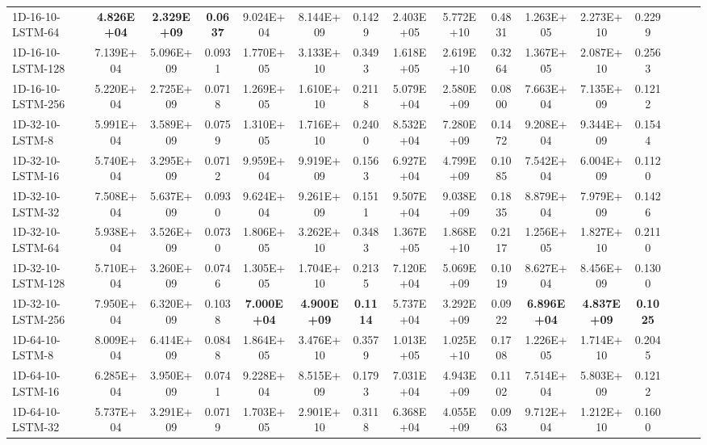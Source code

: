 \begin{landscape}
\begin{longtable}{|l|c|c|c|c|c|c|c|c|c|c|c|c|c|c|c|}
    1D-16-10-LSTM-64 & \cellcolor[rgb]{ .573,  .816,  .314}\textbf{4.826E+04} & \cellcolor[rgb]{ .573,  .816,  .314}\textbf{2.329E+09} & \cellcolor[rgb]{ .573,  .816,  .314}\textbf{0.0637} & 9.024E+04 & 8.144E+09 & 0.1429 & 2.403E+05 & 5.772E+10 & 0.4831 & 1.263E+05 & 2.273E+10 & 0.2299 \\
    1D-16-10-LSTM-128 & 7.139E+04 & 5.096E+09 & 0.0931 & 1.770E+05 & 3.133E+10 & 0.3493 & 1.618E+05 & 2.619E+10 & 0.3264 & 1.367E+05 & 2.087E+10 & 0.2563 \\
    1D-16-10-LSTM-256 & 5.220E+04 & 2.725E+09 & 0.0718 & 1.269E+05 & 1.610E+10 & 0.2118 & 5.079E+04 & 2.580E+09 & 0.0800 & 7.663E+04 & 7.135E+09 & 0.1212 \\
    1D-32-10-LSTM-8 & 5.991E+04 & 3.589E+09 & 0.0759 & 1.310E+05 & 1.716E+10 & 0.2400 & 8.532E+04 & 7.280E+09 & 0.1472 & 9.208E+04 & 9.344E+09 & 0.1544 \\
    1D-32-10-LSTM-16 & 5.740E+04 & 3.295E+09 & 0.0712 & 9.959E+04 & 9.919E+09 & 0.1563 & 6.927E+04 & 4.799E+09 & 0.1085 & 7.542E+04 & 6.004E+09 & 0.1120 \\
    1D-32-10-LSTM-32 & 7.508E+04 & 5.637E+09 & 0.0930 & 9.624E+04 & 9.261E+09 & 0.1511 & 9.507E+04 & 9.038E+09 & 0.1835 & 8.879E+04 & 7.979E+09 & 0.1426 \\
    1D-32-10-LSTM-64 & 5.938E+04 & 3.526E+09 & 0.0730 & 1.806E+05 & 3.262E+10 & 0.3483 & 1.367E+05 & 1.868E+10 & 0.2117 & 1.256E+05 & 1.827E+10 & 0.2110 \\
    1D-32-10-LSTM-128 & 5.710E+04 & 3.260E+09 & 0.0746 & 1.305E+05 & 1.704E+10 & 0.2135 & 7.120E+04 & 5.069E+09 & 0.1019 & 8.627E+04 & 8.456E+09 & 0.1300 \\
    1D-32-10-LSTM-256 & 7.950E+04 & 6.320E+09 & 0.1038 & \cellcolor[rgb]{ .573,  .816,  .314}\textbf{7.000E+04} & \cellcolor[rgb]{ .573,  .816,  .314}\textbf{4.900E+09} & \cellcolor[rgb]{ .573,  .816,  .314}\textbf{0.1114} & 5.737E+04 & 3.292E+09 & 0.0922 & \cellcolor[rgb]{ .573,  .816,  .314}\textbf{6.896E+04} & \cellcolor[rgb]{ .573,  .816,  .314}\textbf{4.837E+09} & \cellcolor[rgb]{ .573,  .816,  .314}\textbf{0.1025} \\
    1D-64-10-LSTM-8 & 8.009E+04 & 6.414E+09 & 0.0848 & 1.864E+05 & 3.476E+10 & 0.3579 & 1.013E+05 & 1.025E+10 & 0.1708 & 1.226E+05 & 1.714E+10 & 0.2045 \\
    1D-64-10-LSTM-16 & 6.285E+04 & 3.950E+09 & 0.0741 & 9.228E+04 & 8.515E+09 & 0.1793 & 7.031E+04 & 4.943E+09 & 0.1102 & 7.514E+04 & 5.803E+09 & 0.1212 \\
    1D-64-10-LSTM-32 & 5.737E+04 & 3.291E+09 & 0.0719 & 1.703E+05 & 2.901E+10 & 0.3118 & 6.368E+04 & 4.055E+09 & 0.0963 & 9.712E+04 & 1.212E+10 & 0.1600 \\

\end{longtable}
\end{landscape}
